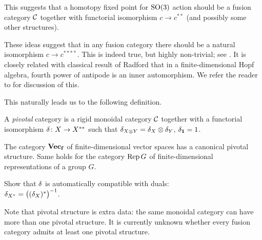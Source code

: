 This suggests that a homotopy fixed point for $\mathrm{SO}(3)$ action should be a fusion
category $\mathcal{C}$ together with functorial isomorphism $c\to c^{**}$ (and
possibly some other structures).

\begin{remark}\label{r:radford}
  These ideas suggest that in any fusion category there should be a natural
  isomorphism $c\to c^{****}$. This is indeed true, but highly non-trivial; see
  \cite[Corollary 7.19.3]{etingof-fusion}. It is closely related with
  classical result of Radford that in a finite-dimensional Hopf algebra, fourth
  power of antipode is an inner automorphism. We refer the reader to
  \cite[Section 7.19]{etingof-fusion} for discussion of this.
\end{remark}

This naturally leads us to the following definition.

\begin{definition}\label{d:pivotal}
  A \emph{pivotal} category is a rigid monoidal category $\mathcal{C}$ together with a
  functorial isomorphism $\delta\colon X\to X^{**}$ such that $\delta_{X\otimes Y} =
  \delta_X \otimes \delta_Y$, $\delta_{\mathbf{1}}=1$.
\end{definition}

\begin{example}\label{x:vecf-pivotal}
  The category $\mathbf{Vec_f}$ of finite-dimensional vector spaces has a canonical
  pivotal structure. Same holds for the category $\operatorname{Rep} G$ of finite-dimensional
  representations of a group $G$.
\end{example}

\begin{exercise}\label{ec:pivotal-duals-compatible}
  Show that $\delta$ is automatically compatible with duals:\\
  $\delta_{X^*}=\bigl((\delta_X)^*\bigr)^{-1}$.
\end{exercise}

Note that pivotal structure is extra data: the same monoidal category can have
more than one pivotal structure. It is currently unknown whether every fusion
category admits at least one pivotal structure.


